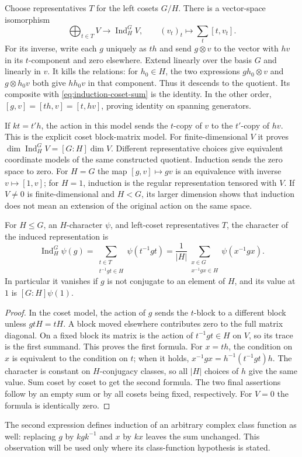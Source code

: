 Choose representatives $T$ for the left cosets $G/H$. There is a
vector-space isomorphism
\begin{equation}\label{eq:induction-coset-sum}
 \bigoplus_{t\in T}V\longrightarrow\operatorname{Ind}_H^G V,
 \qquad(v_t)_t\longmapsto\sum_t[t,v_t].
\end{equation}
For its inverse, write each $g$ uniquely as $th$ and send $g\otimes v$
to the vector with $hv$ in its $t$-component and zero elsewhere.
Extend linearly over the basis $G$ and linearly in $v$. It kills the
relations: for $h_0\in H$, the two expressions $gh_0\otimes v$
and $g\otimes h_0v$ both give $hh_0v$ in that component.
Thus it descends to the quotient. Its composite with
\eqref{eq:induction-coset-sum} is the identity. In the other order,
$[g,v]=[th,v]=[t,hv]$, proving identity on spanning generators.

If $kt=t'h$, the action in this model sends the $t$-copy of $v$ to
the $t'$-copy of $hv$. This is the explicit coset block-matrix model.
For finite-dimensional $V$ it proves
$\dim\operatorname{Ind}_H^G V=[G:H]\dim V$. Different representative
choices give equivalent coordinate models of the same constructed
quotient. Induction sends the zero space to zero. For $H=G$ the map
$[g,v]\mapsto gv$ is an equivalence with inverse $v\mapsto[1,v]$;
for $H=1$, induction is the regular representation tensored with $V$.
If $V\ne0$ is finite-dimensional and $H<G$, its larger dimension shows that induction
does not mean an extension of the original action on the same space.

\begin{theorem}\label{thm:induced-character-formula}
For $H\leq G$, an $H$-character $\psi$, and left-coset representatives
$T$, the character of the induced representation is
\[
 \operatorname{Ind}_H^G\psi(g)
 =\sum_{\substack{t\in T\\t^{-1}gt\in H}}\psi(t^{-1}gt)
 =\frac1{|H|}\sum_{\substack{x\in G\\x^{-1}gx\in H}}
       \psi(x^{-1}gx).
\]
In particular it vanishes if $g$ is not conjugate to an element of $H$,
and its value at $1$ is $[G:H]\psi(1)$.
\end{theorem}
\begin{proof}
In the coset model, the action of $g$ sends the $t$-block to a different
block unless $gtH=tH$. A block moved elsewhere contributes zero
to the full matrix diagonal. On a fixed block its matrix is the action
of $t^{-1}gt\in H$ on $V$, so its trace is the first summand.
This proves the first formula. For $x=th$, the condition on $x$ is
equivalent to the condition on $t$; when it holds,
$x^{-1}gx=h^{-1}(t^{-1}gt)h$. The character is constant on
$H$-conjugacy classes, so all $|H|$ choices of $h$ give the same
value. Sum coset by coset to get the second formula. The two final
assertions follow by an empty sum or by all cosets being fixed,
respectively. For $V=0$ the formula is identically zero.
\end{proof}
The second expression defines induction of an arbitrary complex class
function as well: replacing $g$ by $kgk^{-1}$ and $x$ by $kx$
leaves the sum unchanged. This observation will be used only where its
class-function hypothesis is stated.

